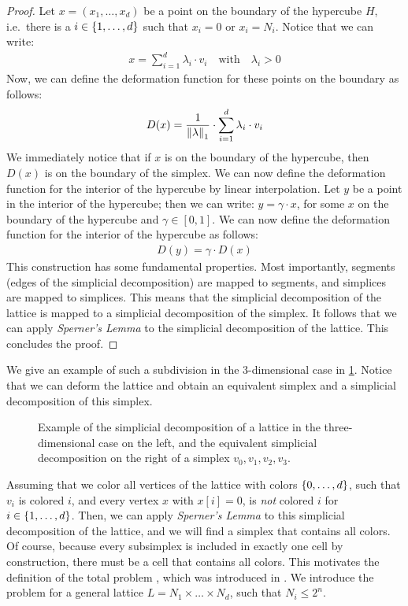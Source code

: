 \begin{proof}
	Let $x = (x_1, \dots, x_d)$ be a point on the boundary of the hypercube $H$, i.e.\ there is a $i \in \left\{1, \dots, d\right\}$ such that $x_i = 0$ or $x_i = N_i$. Notice that we can write:
	\begin{align*}
		x = \sum_{i=1}^{d} \lambda_i \cdot v_i \quad \text{with} \quad \lambda_i > 0
	\end{align*}
	Now, we can define the deformation function for these points on the boundary as follows:
	\begin{align*}
		D(x) = \frac{1}{\left\lVert\lambda\right\rVert_1} \cdot \sum_{i=1}^{d} \lambda_i \cdot v_i
	\end{align*}
	We immediately notice that if $x$ is on the boundary of the hypercube, then $D(x)$ is on the boundary of the simplex. We can now define the deformation function for the interior of the hypercube by linear interpolation. Let $y$ be a point in the interior of the hypercube; then we can write: $y = \gamma \cdot x$, for some $x$ on the boundary of the hypercube and $\gamma \in [0, 1]$. We can now define the deformation function for the interior of the hypercube as follows:
	\begin{align*}
		D(y) = \gamma \cdot D(x)
	\end{align*}
	This construction has some fundamental properties. Most importantly, segments (edges of the simplicial decomposition) are mapped to segments, and simplices are mapped to simplices. This means that the simplicial decomposition of the lattice is mapped to a simplicial decomposition of the simplex. It follows that we can apply \textit{Sperner's Lemma} to the simplicial decomposition of the lattice. This concludes the proof.
\end{proof}

We give an example of such a subdivision in the 3-dimensional case in \cref{fig:sperner_lattice_example}. Notice that we can deform the lattice and obtain an equivalent simplex and a simplicial decomposition of this simplex.

\begin{figure}
	\centering
	\caption[Example of a simplicial decomposition of a lattice]{Example of the simplicial decomposition of a lattice in the three-dimensional case on the left, and the equivalent simplicial decomposition on the right of a simplex $v_0, v_1, v_2, v_3$.}
	\label{fig:sperner_lattice_example}
\end{figure}

Assuming that we color all vertices of the lattice with colors $\left\{0, \dots, d\right\}$, such that $v_i$ is colored $i$, and every vertex $x$ with $x[i] = 0$, is \textit{not} colored $i$ for $i \in \left\{1, \dots, d\right\}$. Then, we can apply \textit{Sperner's Lemma} to this simplicial decomposition of the lattice, and we will find a simplex that contains all colors. Of course, because every subsimplex is included in exactly one cell by construction, there must be a cell that contains all colors. This motivates the definition of the total problem \Sperner, which was introduced in . We introduce the problem for a general lattice $L = N_1 \times \dots \times N_d$, such that $N_i \leq 2^n$.

